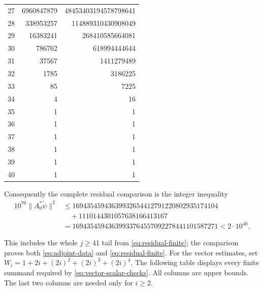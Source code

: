 {\begin{longtable}{rrr}
27 & 6960847879 & 48453403194578798641\\
28 & 338953257 & 114889310430908049\\
29 & 16383241 & 268410585664081\\
30 & 786762 & 618994444644\\
31 & 37567 & 1411279489\\
32 & 1785 & 3186225\\
33 & 85 & 7225\\
34 & 4 & 16\\
35 & 1 & 1\\
36 & 1 & 1\\
37 & 1 & 1\\
38 & 1 & 1\\
39 & 1 & 1\\
40 & 1 & 1\\
\end{longtable}
}
Consequently the complete residual comparison is the integer inequality
\begin{align*}
 10^{70}\|A_0^*\widetilde\psi\|^2&\le 16943545943639932654412791220802935174104\\
 &\quad+1110144301057638166413167\\
 &=16943545943639933764557092278441101587271<2\cdot10^{40}.
\end{align*}

This includes the whole $j\ge41$ tail from \eqref{eq:residual-finite}; the
comparison proves both \eqref{eq:adjoint-data} and \eqref{eq:residual-finite}.
For the vector estimates, set $W_i=1+2i+(2i)^2+(2i)^3+(2i)^4$.
The following table displays every finite summand required by
\eqref{eq:vector-scalar-checks}. All columns are upper bounds. The last two
columns are needed only for $i\ge2$.

